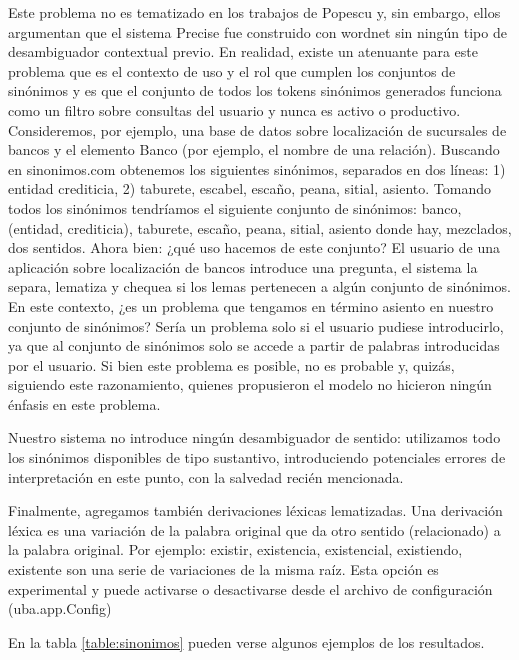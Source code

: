 Este problema no es tematizado en los trabajos de Popescu y, sin embargo, ellos argumentan que el sistema Precise fue construido con wordnet sin ningún tipo de desambiguador contextual previo.
En realidad, existe un atenuante para este problema que es el contexto de uso y el rol que cumplen los conjuntos de sinónimos y es que el conjunto de todos los tokens sinónimos generados funciona como un filtro sobre consultas del usuario y nunca es activo o productivo.
Consideremos, por ejemplo, una base de datos sobre localización de sucursales de bancos y el elemento Banco (por ejemplo, el nombre de una relación).
Buscando en sinonimos.com obtenemos los siguientes sinónimos, separados en dos líneas: 1) entidad crediticia, 2) taburete, escabel, escaño, peana, sitial, asiento. Tomando todos los sinónimos tendríamos el siguiente conjunto de sinónimos: {banco, (entidad, crediticia), taburete, escaño, peana, sitial, asiento} donde hay, mezclados, dos sentidos. Ahora bien: ¿qué uso hacemos de este conjunto? El usuario de una aplicación sobre localización de bancos introduce una pregunta, el sistema la separa, lematiza y chequea si los lemas pertenecen a algún conjunto de sinónimos. En este contexto, ¿es un problema que tengamos en término asiento en nuestro conjunto de sinónimos? Sería un problema solo si el usuario pudiese introducirlo, ya que al conjunto de sinónimos solo se accede a partir de palabras introducidas por el usuario. Si bien este problema es posible, no es probable y, quizás, siguiendo este razonamiento, quienes propusieron el modelo no hicieron ningún énfasis en este problema.

Nuestro sistema no introduce ningún desambiguador de sentido: utilizamos todo los sinónimos disponibles de tipo sustantivo, introduciendo potenciales errores de interpretación en este punto, con la salvedad recién mencionada.


Finalmente, agregamos también derivaciones léxicas lematizadas. Una derivación léxica es una variación de la palabra original que da otro sentido (relacionado) a la palabra original. Por ejemplo: existir, existencia, existencial, existiendo, existente son una serie de variaciones de la misma raíz.  Esta opción es experimental y puede activarse o desactivarse desde el archivo de configuración (uba.app.Config)

En la tabla \ref{table:sinonimos} pueden verse algunos ejemplos de los resultados.

